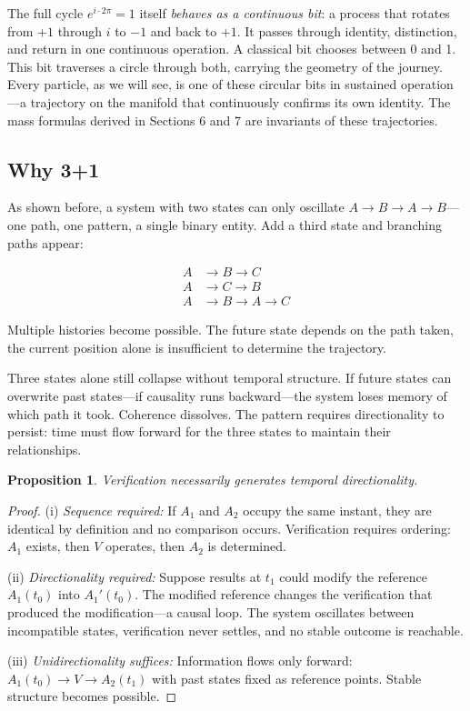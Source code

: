 \documentclass[12pt]{article}
\newtheorem{proposition}{Proposition}
\begin{document}
The full cycle $e^{i \cdot 2\pi} = 1$ itself \textit{behaves as a continuous bit}: a process that rotates from $+1$ through $i$ to $-1$ and back to $+1$. It passes through identity, distinction, and return in one continuous operation. A classical bit chooses between 0 and 1. This bit traverses a circle through both, carrying the geometry of the journey. Every particle, as we will see, is one of these circular bits in sustained operation---a trajectory on the manifold that continuously confirms its own identity. The mass formulas derived in Sections 6 and 7 are invariants of these trajectories.

\subsection{Why 3+1}

As shown before, a system with two states can only oscillate $A \to B \to A \to B$---one path, one pattern, a single binary entity. Add a third state and branching paths appear:

\begin{align*}
A &\to B \to C \\
A &\to C \to B \\
A &\to B \to A \to C
\end{align*}

Multiple histories become possible. The future state depends on the path taken, the current position alone is insufficient to determine the trajectory.

Three states alone still collapse without temporal structure. If future states can overwrite past states---if causality runs backward---the system loses memory of which path it took. Coherence dissolves. The pattern requires directionality to persist: time must flow forward for the three states to maintain their relationships.

\begin{proposition}
Verification necessarily generates temporal directionality.
\end{proposition}

\begin{proof}
(i) \textit{Sequence required:} If $A_1$ and $A_2$ occupy the same instant, they are identical by definition and no comparison occurs. Verification requires ordering: $A_1$ exists, then $V$ operates, then $A_2$ is determined.

(ii) \textit{Directionality required:} Suppose results at $t_1$ could modify the reference $A_1(t_0)$ into $A_1'(t_0)$. The modified reference changes the verification that produced the modification---a causal loop. The system oscillates between incompatible states, verification never settles, and no stable outcome is reachable.

(iii) \textit{Unidirectionality suffices:} Information flows only forward: $A_1(t_0) \to V \to A_2(t_1)$ with past states fixed as reference points. Stable structure becomes possible.
\end{proof}
\end{document}
